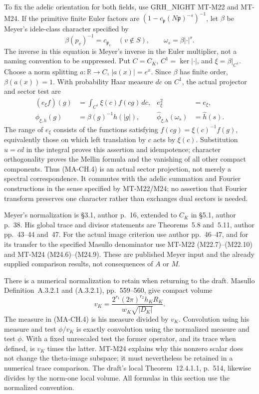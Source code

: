 To fix the adelic orientation for both fields, use GRH\_NIGHT
MT-M22 and MT-M24.  If the primitive finite Euler factors are
$(1-c_{\mathfrak p}(N\mathfrak p)^{-s})^{-1}$, let $\beta$ be
Meyer's idele-class character specified by
\[
       \beta(p_v)^{-1}=c_{\mathfrak p_v}
       \quad(v\notin S),\qquad
       \omega_s=\beta|\cdot|^s .
 \tag{MA-CH.3}
\]
The inverse in this equation is Meyer's inverse in the Euler
multiplier, not a naming convention to be suppressed.  Put
$C=C_K$, $C^1=\ker|\cdot|$, and $\xi=\beta|_{C^1}$.
Choose a norm splitting $a:\mathbb R\to C$, $|a(x)|=e^x$.
Since $\beta$ has finite order, $\beta(a(x))=1$.
With probability Haar measure $dc$ on $C^1$, the actual projector
and sector test are
\[
 \begin{aligned}
 (e_\xi f)(g)&=\int_{C^1}\xi(c)f(cg)\,dc,
       &e_\xi^2&=e_\xi,\\
 \phi_{\xi,h}(g)&=\beta(g)^{-1}h(|g|),
       &\widehat\phi_{\xi,h}(\omega_s)&=\widehat h(s).
 \end{aligned}
 \tag{MA-CH.4}
\]
The range of $e_\xi$ consists of the functions satisfying
$f(cg)=\xi(c)^{-1}f(g)$, equivalently those on which left
translation by $c$ acts by $\xi(c)$.  Substitution $u=cd$ in the
integral proves this assertion and idempotence; character
orthogonality proves the Mellin formula and the vanishing of all
other compact components.  Thus (MA-CH.4) is an actual sector
projection, not merely a spectral correspondence.  It commutes
with the adelic summation and Fourier constructions in the sense
specified by MT-M22/M24; no assertion that Fourier transform
preserves one character rather than exchanges dual sectors is
needed.

Meyer's normalization is \S3.1, author p.~16, extended to $C_K$
in \S5.1, author p.~38.  His global trace and divisor statements
are Theorems~5.8 and~5.11, author pp.~43--44 and~47.
For the actual image criterion use author pp.~46--47, and for
its transfer to the specified Masullo denominator use MT-M22
(M22.7)--(M22.10) and MT-M24 (M24.6)--(M24.9).
These are published Meyer input and the already supplied
comparison results, not consequences of $A$ or $M$.

There is a numerical normalization to retain when returning to
the draft.  Masullo Definition~A.3.2.1 and (A.3.2.1), pp.~559--560,
give compact volume
\[
 v_K=\frac{2^{r_1}(2\pi)^{r_2}h_KR_K}
                  {w_K\sqrt{|D_K|}}.
 \tag{MA-CH.5}
\]
The measure in (MA-CH.4) is his measure divided by $v_K$.
Convolution using his measure and test $\phi/v_K$ is exactly
convolution using the normalized measure and test $\phi$.
With a fixed unrescaled test the former operator, and its trace
when defined, is $v_K$ times the latter.  MT-M24 explains why
this nonzero scalar does not change the theta-image subspace;
it must nevertheless be retained in a numerical trace
comparison.  The draft's local Theorem~12.4.1.1, p.~514,
likewise divides by the norm-one local volume.  All formulas
in this section use the normalized convention.

